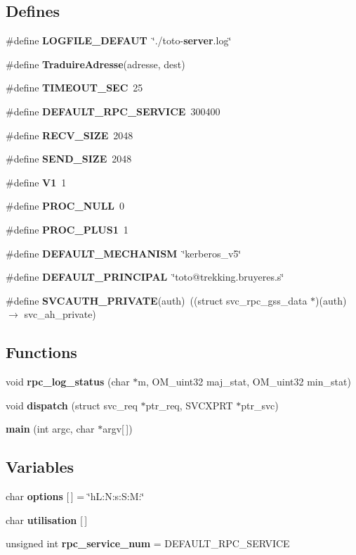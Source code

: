 \subsection*{Defines}
\begin{CompactItemize}
\item 
\#define {\bf LOGFILE\_\-DEFAUT}\ \char`\"{}./toto-{\bf server}.log\char`\"{}
\item 
\#define {\bf Traduire\-Adresse}(adresse, dest)
\item 
\#define {\bf TIMEOUT\_\-SEC}\ 25
\item 
\#define {\bf DEFAULT\_\-RPC\_\-SERVICE}\ 300400
\item 
\#define {\bf RECV\_\-SIZE}\ 2048
\item 
\#define {\bf SEND\_\-SIZE}\ 2048
\item 
\#define {\bf V1}\ 1
\item 
\#define {\bf PROC\_\-NULL}\ 0
\item 
\#define {\bf PROC\_\-PLUS1}\ 1
\item 
\#define {\bf DEFAULT\_\-MECHANISM}\ \char`\"{}kerberos\_\-v5\char`\"{}
\item 
\#define {\bf DEFAULT\_\-PRINCIPAL}\ \char`\"{}toto@trekking.bruyeres.s\char`\"{}
\item 
\#define {\bf SVCAUTH\_\-PRIVATE}(auth)\ ((struct svc\_\-rpc\_\-gss\_\-data $\ast$)(auth) $\rightarrow$ svc\_\-ah\_\-private)
\end{CompactItemize}
\subsection*{Functions}
\begin{CompactItemize}
\item 
void {\bf rpc\_\-log\_\-status} (char $\ast$m, OM\_\-uint32 maj\_\-stat, OM\_\-uint32 min\_\-stat)
\item 
void {\bf dispatch} (struct svc\_\-req $\ast$ptr\_\-req, SVCXPRT $\ast$ptr\_\-svc)
\item 
{\bf main} (int argc, char $\ast$argv[$\,$])
\end{CompactItemize}
\subsection*{Variables}
\begin{CompactItemize}
\item 
char {\bf options} [$\,$] = \char`\"{}h\-L:N:s:S:M:\char`\"{}
\item 
char {\bf utilisation} [$\,$]
\item 
unsigned int {\bf rpc\_\-service\_\-num} = DEFAULT\_\-RPC\_\-SERVICE
\end{CompactItemize}


